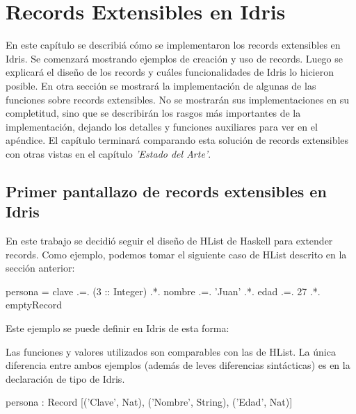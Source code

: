
\chapter{Records Extensibles en Idris}
\label{ch:3}

En este capítulo se describiá cómo se implementaron los records extensibles en Idris. Se comenzará mostrando ejemplos de creación y uso de records. Luego se explicará el diseño de los records y cuáles funcionalidades de Idris lo hicieron posible. En otra sección se mostrará la implementación de algunas de las funciones sobre records extensibles. No se mostrarán sus implementaciones en su completitud, sino que se describirán los rasgos más importantes de la implementación, dejando los detalles y funciones auxiliares para ver en el apéndice. El capítulo terminará comparando esta solución de records extensibles con otras vistas en el capítulo \textit{'Estado del Arte'}.

\section{Primer pantallazo de records extensibles en Idris}

En este trabajo se decidió seguir el diseño de HList de Haskell para extender records. Como ejemplo, podemos tomar el siguiente caso de HList descrito en la sección anterior:

\begin{code}
persona = clave .=. (3 :: Integer)
  .*. nombre .=. 'Juan'
  .*. edad .=. 27
  .*. emptyRecord
\end{code}

Este ejemplo se puede definir en Idris de esta forma:


Las funciones y valores utilizados son comparables con las de HList. La única diferencia entre ambos ejemplos (además de leves diferencias sintácticas) es en la declaración de tipo de Idris.

\begin{code}
persona : Record [('Clave', Nat), ('Nombre', String), 
  ('Edad', Nat)]
\end{code}


